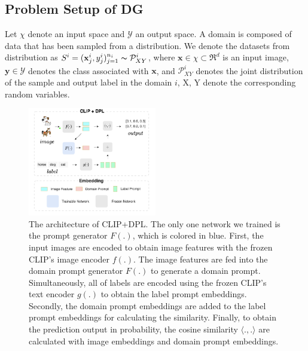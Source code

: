 \documentclass[11pt,twocolumn]{article}
\begin{document}
\subsection{Problem Setup of DG}
Let $\chi$ denote an input space and \begin{math}\mathcal{Y}\end{math} an output space. A domain is composed of data that has been sampled from a distribution. We denote the datasets from distribution as \begin{math}
S^i=(\mathbf{x}^i_j,y^i_j)_{j=1}^{n_i}\thicksim \mathcal{P}_{XY}^i
\end{math}, where \begin{math}
\mathbf{x} \in \chi \subset \Re^d \end{math} is an input image, 
\begin{math} \mathbf{y} \in \mathcal{Y}
\end{math} denotes the class associated with \begin{math}
    \mathbf{x}
\end{math}, and \begin{math}
    \mathcal{P}_{XY}^i
\end{math} denotes the joint distribution of the sample and output label in the domain $i$, X, Y denote the corresponding random variables.\\
\begin{figure}
    \centering
    \includegraphics[width =0.5\textwidth]{Image3.png}
    \caption{The architecture of CLIP+DPL. The only one network we trained is the prompt generator $F(.)$, which is colored in blue. First, the input images are encoded to obtain image features with the frozen CLIP's image encoder $f(.)$. The image features are fed into the domain prompt generator $F(.)$ to generate a domain prompt. Simultaneously, all of labels are encoded using the frozen CLIP’s text encoder $g(.)$ to obtain the label prompt embeddings. Secondly, the domain prompt embeddings are added to the label prompt embeddings for calculating the similarity. Finally, to obtain the prediction output in probability, the cosine similarity $\langle .,. \rangle$ are calculated with image embeddings and domain prompt embeddings.}
    \label{fig:fig3}
\end{figure}
\end{document}
